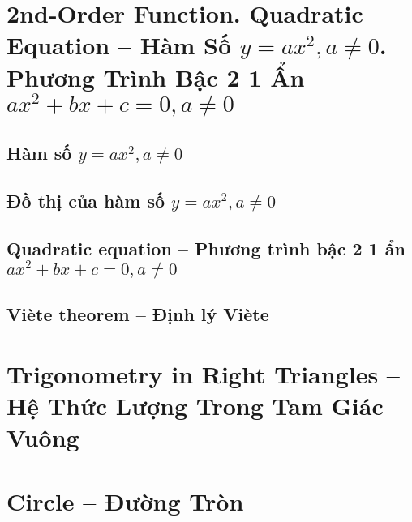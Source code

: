 \documentclass{article}
\begin{document}

\section{2nd-Order Function. Quadratic Equation -- Hàm Số $y = ax^2,a\ne0$. Phương Trình Bậc 2 1 Ẩn $ax^2 + bx + c = 0,a\ne0$}

\subsection{Hàm số $y = ax^2,a\ne0$}

\subsection{Đồ thị của hàm số $y = ax^2,a\ne0$}

\subsection{Quadratic equation -- Phương trình bậc 2 1 ẩn $ax^2 + bx + c = 0,a\ne0$}

\subsection{Vi\`ete theorem -- Định lý Vi\`ete}


\section{Trigonometry in Right Triangles -- Hệ Thức Lượng Trong Tam Giác Vuông}


\section{Circle -- Đường Tròn}
\end{document}
